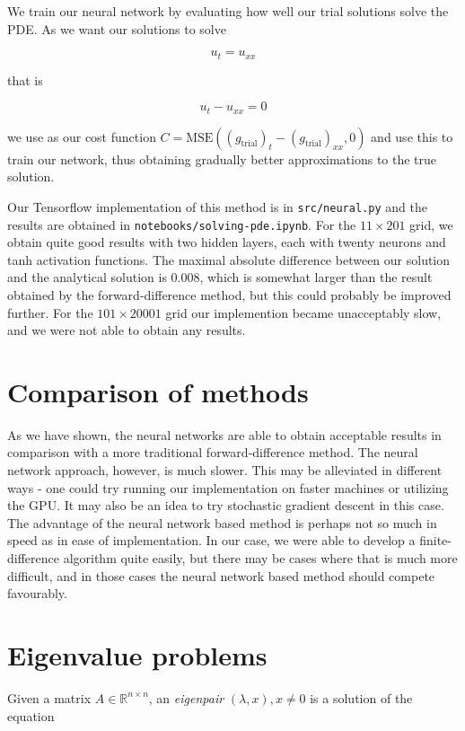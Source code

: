 \documentclass{article}
\begin{document}
We train our neural network by evaluating how well our trial solutions solve the PDE. As we want our solutions to solve

\begin{equation}
    u_t = u_{xx}
\end{equation}

that is

\begin{equation}
    u_t - u_{xx} = 0
\end{equation}

we use as our cost function $C = \textrm{MSE}((g_{\textrm{trial}})_t - (g_{\textrm{trial}})_{xx}, 0)$ and use this to train our network, thus obtaining gradually better approximations to the true solution.

Our Tensorflow implementation of this method is in \texttt{src/neural.py} and the results are obtained in \texttt{notebooks/solving-pde.ipynb}. For the $11 \times 201$ grid, we obtain quite good results with two hidden layers, each with twenty neurons and tanh activation functions. The maximal absolute difference between our solution and the analytical solution is 0.008, which is somewhat larger than the result obtained by the forward-difference method, but this could probably be improved further. For the $101 \times 20001$ grid our implemention became unacceptably slow, and we were not able to obtain any results.

\section{Comparison of methods}
As we have shown, the neural networks are able to obtain acceptable results in comparison with a more traditional forward-difference method. The neural network approach, however, is much slower. This may be alleviated in different ways - one could try running our implementation on faster machines or utilizing the GPU. It may also be an idea to try stochastic gradient descent in this case. The advantage of the neural network based method is perhaps not so much in speed as in ease of implementation. In our case, we were able to develop a finite-difference algorithm quite easily, but there may be cases where that is much more difficult, and in those cases the neural network based method should compete favourably.

\section{Eigenvalue problems}
Given a matrix $A \in \mathbb{R}^{n \times n}$, an \textit{eigenpair} $(\lambda, x), x \neq 0$ is a solution of the equation
\end{document}
